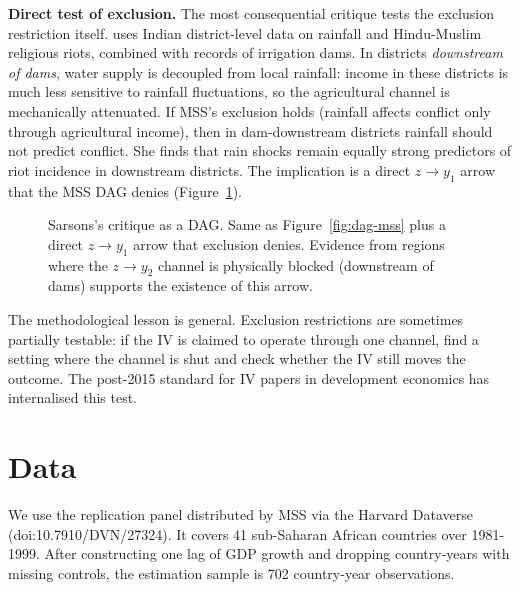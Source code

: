 \documentclass[11pt,a4paper]{article}
\begin{document}
\textbf{Direct test of exclusion.} The most consequential critique
tests the exclusion restriction itself. \citet{Sarsons2015} uses
Indian district-level data on rainfall and Hindu-Muslim religious
riots, combined with records of irrigation dams. In districts
\emph{downstream of dams}, water supply is decoupled from local
rainfall: income in these districts is much less sensitive to rainfall
fluctuations, so the agricultural channel is mechanically attenuated.
If MSS's exclusion holds (rainfall affects conflict only through
agricultural income), then in dam-downstream districts rainfall should
not predict conflict. She finds that rain shocks remain equally strong
predictors of riot incidence in downstream districts. The implication is a
direct $z \to y_1$ arrow that the MSS DAG denies (Figure~\ref{fig:dag-sarsons}).

\begin{figure}[H]
\centering
{}
\caption{Sarsons's critique as a DAG. Same as Figure~\ref{fig:dag-mss}
plus a direct $z \to y_1$ arrow that exclusion denies. Evidence from
regions where the $z \to y_2$ channel is physically blocked
(downstream of dams) supports the existence of this arrow.}
\label{fig:dag-sarsons}
\end{figure}

The methodological lesson is general. Exclusion restrictions are
sometimes partially testable: if the IV is claimed to operate through
one channel, find a setting where the channel is shut and check whether
the IV still moves the outcome. The post-2015 standard for IV papers in
development economics has internalised this test.

\section{Data}\label{sec:data}
{\sloppy We use the replication panel distributed by MSS via the
Harvard Dataverse (doi:10.7910/DVN/27324). It covers 41 sub-Saharan
African countries over 1981-1999. After constructing one lag of GDP
growth and dropping country-years with missing controls, the
estimation sample is 702 country-year observations.\par}
\end{document}
